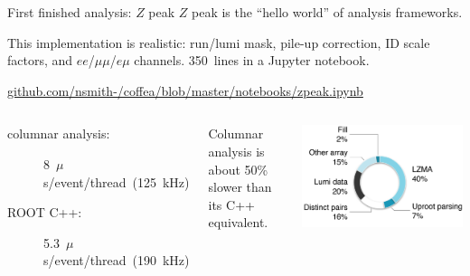 \documentclass[aspectratio=169]{beamer}
\begin{document}
\begin{frame}{First finished analysis: $Z$ peak}
\vspace{0.5 cm}
$Z$ peak is the ``hello world'' of analysis frameworks.

\vspace{0.25 cm}
This implementation is realistic: run/lumi mask, pile-up correction, ID scale factors, and $ee$/$\mu\mu$/$e\mu$ channels. 350~lines in a Jupyter notebook.

\vspace{0.5 cm}
\textcolor{blue}{\small \url{github.com/nsmith-/coffea/blob/master/notebooks/zpeak.ipynb}}

\vspace{0.5 cm}
\begin{columns}[b]
\large
\begin{description}
\item[columnar analysis:] \hfill \mbox{\hspace{-1 cm}8~$\mu$s/event/thread (125~kHz)}
\item[ROOT C++:] \hfill \mbox{\hspace{-1 cm}5.3~$\mu$s/event/thread (190~kHz)}
\end{description}

\vspace{0.25 cm}
Columnar analysis is about 50\% slower than its C++ equivalent.

\includegraphics[width=\linewidth]{zpeak-performance-breakdown.png}
\end{columns}
\end{frame}
\end{document}
